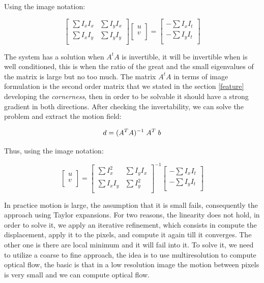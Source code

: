 Using the image notation:


\[
\begin{bmatrix}
    \sum I_{x}I_{x} & \sum I_{y}I_{x}  \\
    \sum I_{x}I_{y} & \sum I_{y}I_{y}   \\
\end{bmatrix}
\begin{bmatrix}
    u \\
    v \\
\end{bmatrix}
=
\begin{bmatrix}
    - \sum I_{x}I_{t} \\
    - \sum I_{y}I_{t} \\
\end{bmatrix}
\]



The system has a solution when $A^{t}A$ is invertible, it will be invertible when is well conditioned, this is when the ratio of the great and the small eigenvalues of the matrix is large but no too much. The matrix $A^{t}A$ in terms of image formulation is the second order matrix that we stated in the section \ref{feature} developing the \textit{cornerness}, then in order to be solvable it should have a strong gradient in both directions. After checking the invertability, we can solve the problem and extract the motion field:

$$ d = (A^{T}A)^{-1} \hspace{0.1cm}  A^{T}  \hspace{0.1cm} b  $$

Thus, using the image notation:

\[
\begin{bmatrix}
    u \\
    v \\
\end{bmatrix}
=
\begin{bmatrix}
    \sum I_{x}^{2} & \sum I_{y}I_{x}  \\
    \sum I_{x}I_{y} & \sum I_{y}^{2}   \\
\end{bmatrix}^{-1}
\begin{bmatrix}
    - \sum I_{x}I_{t} \\
    - \sum I_{y}I_{t} \\
\end{bmatrix}
\]



In practice motion is large, the assumption that it is small fails, consequently the approach using Taylor expansions. For two reasons, the linearity does not hold, in order to solve it, we apply an iterative refinement, which consists in compute the displacement, apply it to the pixels, and compute it again till it converges. The other one is there are local minimum and it will fail into it. To solve it, we need to utilize a coarse to fine approach, the idea is to use multiresolution to compute optical flow, the basic is that in a low resolution image the motion between pixels is very small and we can compute optical flow.

